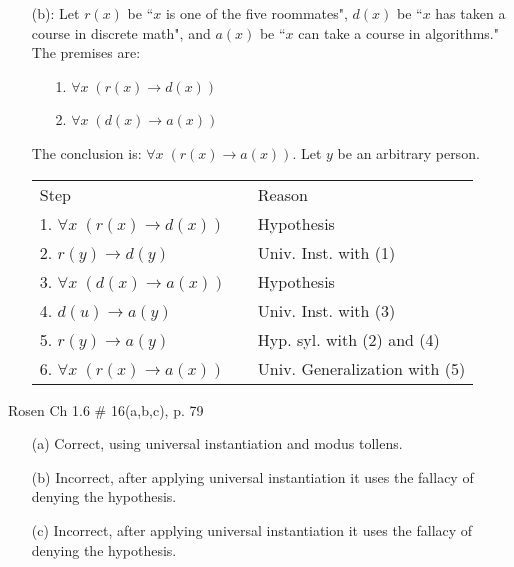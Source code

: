 \documentclass[12pt,addpoints]{exam}
\begin{document}
\begin{questions}
\begin{solution}
\begin{itemize}[itemsep=0pt,parsep=0pt,topsep=0pt,partopsep=0pt]
    \item[(b):] Let $r(x)$ be ``$x$ is one of the five roommates", $d(x)$ be ``$x$ has taken a course in discrete math", and $a(x)$ be ``$x$ can take a course in algorithms." The premises are:
    \begin{itemize}[itemsep=0pt,parsep=0pt,topsep=0pt,partopsep=0pt]
        \item[1.] $\forall x\;(r(x) \rightarrow d(x))$
        \item[2.] $\forall x\;(d(x) \rightarrow a(x))$
    \end{itemize}
    The conclusion is: $\forall x\;(r(x) \rightarrow a(x))$.  Let $y$ be an arbitrary person.

    \smallskip
    \begin{tabular}{lll}
        Step        & \hspace{0.2in} & Reason \\
        1. $\forall x\;(r(x) \rightarrow d(x))$     &   & Hypothesis \\
        2. $r(y) \rightarrow d(y)$                  & & Univ. Inst. with (1) \\
        3. $\forall x\; (d(x) \rightarrow a(x))$    &   & Hypothesis \\
        4. $d(u) \rightarrow a(y)$                  &   & Univ. Inst. with (3) \\
        5. $r(y) \rightarrow a(y)$                  &   & Hyp. syl. with (2) and (4) \\
        6. $\forall x\;(r(x) \rightarrow a(x))$     &   & Univ. Generalization with (5) \\
    \end{tabular}
    \end{itemize}
\end{solution}


\question Rosen Ch 1.6 \# 16(a,b,c), p. 79
    \ifprintanswers
        \vspace{-10pt}
    \fi
\begin{solution}
    \begin{itemize}[itemsep=0pt,parsep=0pt,topsep=0pt,partopsep=0pt]
        \item[(a)] Correct, using universal instantiation and modus tollens.
        \item[(b)] Incorrect, after applying universal instantiation it uses the fallacy of denying the hypothesis.
        \item[(c)] Incorrect, after applying universal instantiation it uses the fallacy of denying the hypothesis.
    \end{itemize}
\end{solution}



\end{questions}
\end{document}
